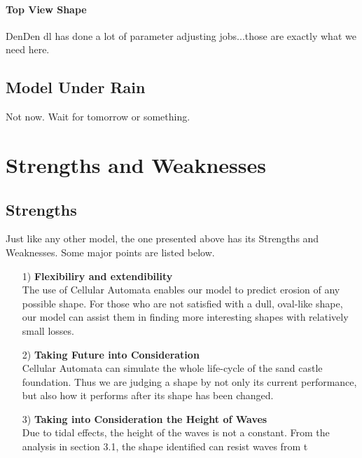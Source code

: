 \documentclass[12pt]{article}
\begin{document}
\paragraph{Top View Shape}
DenDen dl has done a lot of parameter adjusting jobs...those are exactly what we need here.
\subsection{Model Under Rain}
Not now. Wait for tomorrow or something.


\section{Strengths and Weaknesses}
\subsection{Strengths}
Just like any other model, the one presented above has its Strengths and Weaknesses. Some major points are listed below.
\begin{itemize}
    \item [1)]
	    \textbf{Flexibiliry and extendibility}\\
	    The use of Cellular Automata enables our model to predict erosion of any possible shape. For those who are not satisfied with a dull, oval-like shape, our model can assist them in finding more interesting shapes with relatively small losses.
    \item [2)]
	    \textbf{Taking Future into Consideration}\\
	    Cellular Automata can simulate the whole life-cycle of the sand castle foundation. Thus we are judging a shape by not only its current performance, but also how it performs after its shape has been changed.
    \item [3)]
	    \textbf{Taking into Consideration the Height of Waves}\\
	    Due to tidal effects, the height of the waves is not a constant. From the analysis in section 3.1, the shape identified can resist waves from t
\end{itemize}
\end{document}
